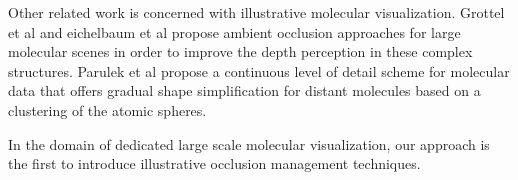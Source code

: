 Other related work is concerned with illustrative molecular visualization. Grottel et al and eichelbaum et al propose ambient occlusion approaches for large molecular scenes in order to improve the depth perception in these complex structures. Parulek et al propose a continuous level of detail scheme for molecular data that offers gradual shape simplification for distant molecules based on a clustering of the atomic spheres.

In the domain of dedicated large scale molecular visualization, our approach is the first to introduce illustrative occlusion management techniques.


	
\cite{Viola05}
\cite{Burns07}
\cite{Burns08}
\cite{Li07}
\cite{Lidal12}

